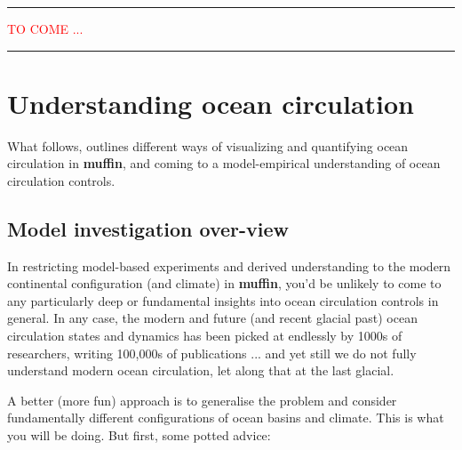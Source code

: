 \documentclass[11pt,fleqn]{book} %
\begin{document}
\vspace{1mm}
\noindent\rule{4cm}{0.5pt}
\vspace{2mm}

\noindent\textcolor{red}{TO COME ...}

\vspace{1mm}
\noindent\rule{4cm}{0.5pt}
\vspace{2mm}


\newpage

%
\section{Understanding ocean circulation}


What follows, outlines different ways of visualizing and quantifying ocean circulation in \textbf{muffin}, and coming to a model-empirical understanding of ocean circulation controls.


\subsection{Model investigation over-view}

In restricting model-based experiments and derived understanding to   the modern continental configuration (and climate) in \textbf{muffin}, you'd be unlikely to come to any particularly deep or fundamental insights into ocean circulation controls in general. In any case, the modern and future (and recent glacial past) ocean circulation states and dynamics has been picked at endlessly by 1000s of researchers, writing 100,000s of  publications ... and yet still we do not fully understand modern ocean circulation, let along that at the last glacial.

A better (more fun) approach is to generalise the problem and consider fundamentally different configurations of ocean basins and climate. This is what you will be doing. But first, some potted advice:
\end{document}
